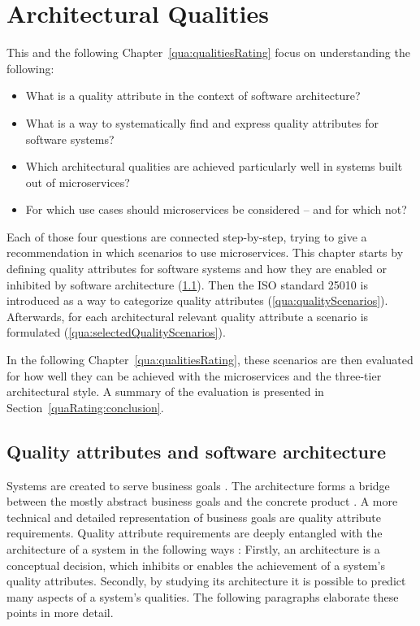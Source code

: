 \chapter{Architectural Qualities}
\label{qua:architecturalQua}
This and the following Chapter~\ref{qua:qualitiesRating} focus on understanding the following:
\begin{itemize}
\item What is a quality attribute in the context of software architecture?
\item What is a way to systematically find and express quality attributes for software systems?
\item Which architectural qualities are achieved particularly well in systems built out of microservices?
\item For which use cases should microservices be considered -- and for which not?
\end{itemize}

Each of those four questions are connected step-by-step, trying to give a recommendation in which scenarios to use microservices.
This chapter starts by defining quality attributes for software systems and how they are enabled or inhibited by software architecture (\ref{qua:qualityAttributes}).
Then the ISO standard 25010 is introduced as a way to categorize quality attributes (\ref{qua:qualityScenarios}).
Afterwards, for each architectural relevant quality attribute a scenario is formulated (\ref{qua:selectedQualityScenarios}).

In the following Chapter~\ref{qua:qualitiesRating}, these scenarios are then evaluated for how well they can be achieved with the microservices and the three-tier architectural style. 
A summary of the evaluation is presented in Section~\ref{quaRating:conclusion}.

\section{Quality attributes and software architecture}
\label{qua:qualityAttributes}
Systems are created to serve business goals \citep[p. 49]{Bass2012}.
The architecture forms a bridge between the mostly abstract business goals and the concrete product \citep[p. 3]{Bass2012}.
A more technical and detailed representation of business goals are quality attribute requirements.
Quality attribute requirements are deeply entangled with the architecture of a system in the following ways \citep[p. 40]{Bass2012}:
Firstly, an architecture is a conceptual decision, which inhibits or enables the achievement of a system's quality attributes.
Secondly, by studying its architecture it is possible to predict many aspects of a system's qualities.
The following paragraphs elaborate these points in more detail.

